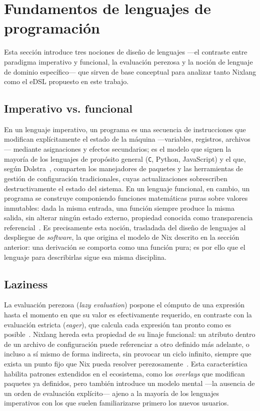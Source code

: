 \section{Fundamentos de lenguajes de programación}

Esta sección introduce tres nociones de diseño de lenguajes ---el contraste entre paradigma imperativo y funcional, la evaluación perezosa y la noción de lenguaje de dominio específico--- que sirven de base conceptual para analizar tanto Nixlang como el eDSL propuesto en este trabajo.

\subsection{Imperativo vs. funcional}

En un lenguaje imperativo, un programa es una secuencia de instrucciones que modifican explícitamente el estado de la máquina ---variables, registros, archivos--- mediante asignaciones y efectos secundarios; es el modelo que siguen la mayoría de los lenguajes de propósito general (\texttt{C}, Python, JavaScript) y el que, según Dolstra~\cite{Dolstra2008}, comparten los manejadores de paquetes y las herramientas de gestión de configuración tradicionales, cuyas actualizaciones sobrescriben destructivamente el estado del sistema. En un lenguaje funcional, en cambio, un programa se construye componiendo funciones matemáticas puras sobre valores inmutables: dada la misma entrada, una función siempre produce la misma salida, sin alterar ningún estado externo, propiedad conocida como transparencia referencial~\cite{Hudak1989}. Es precisamente esta noción, trasladada del diseño de lenguajes al despliegue de \emph{software}, la que origina el modelo de Nix descrito en la sección anterior: una derivación se comporta como una función pura; es por ello que el lenguaje para describirlas sigue esa misma disciplina.

\subsection{Laziness}

La evaluación perezosa (\emph{lazy evaluation}) pospone el cómputo de una expresión hasta el momento en que su valor es efectivamente requerido, en contraste con la evaluación estricta (\emph{eager}), que calcula cada expresión tan pronto como es posible~\cite{Hudak1989}. Nixlang hereda esta propiedad de su linaje funcional: un atributo dentro de un archivo de configuración puede referenciar a otro definido más adelante, o incluso a sí mismo de forma indirecta, sin provocar un ciclo infinito, siempre que exista un punto fijo que Nix pueda resolver perezosamente~\cite{Dolstra2006}. Esta característica habilita patrones extendidos en el ecosistema, como los \emph{overlays} que modifican paquetes ya definidos, pero también introduce un modelo mental ---la ausencia de un orden de evaluación explícito--- ajeno a la mayoría de los lenguajes imperativos con los que suelen familiarizarse primero los nuevos usuarios.

